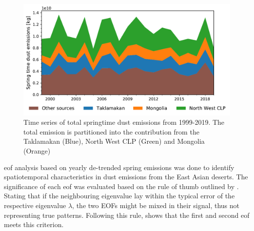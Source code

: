 \begin{figure}[htbp]
    \centering
    \includegraphics[width=\textwidth]{texfiles/figs/emission_timeseries_1999_2019.pdf}
    \caption{Time series of total springtime dust emissions from 1999-2019. The total emission is partitioned into the contribution from the Taklamakan (Blue), North West CLP (Green) and Mongolia (Orange) }
    \label{fig:emission_timeseries}
\end{figure}

\acrfull{eof} analysis based on yearly de-trended spring emissions was done to identify spatiotemporal characteristics in dust emissions from the East Asian deserts.
The significance of each \acrshort{eof} was evaluated based on the rule of thumb outlined by \textcite{north1982sampling}. 
Stating that if the neighbouring eigenvalue lay within the typical error of the respective eigenvalue $\lambda$, the two EOFs might be mixed in their signal, thus not representing true patterns.
Following this rule,  shows that the first and second \acrshort{eof} meets this criterion.  

